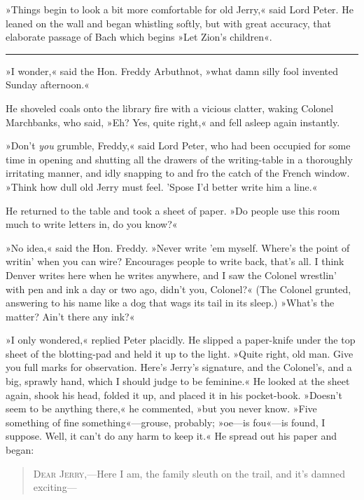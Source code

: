 »Things begin to look a bit more comfortable for old Jerry,« said Lord Peter. He leaned on the wall and began whistling softly, but with great accuracy, that elaborate passage of Bach which begins »Let Zion's children«.

\noindent\hfil\rule{0.5\textwidth}{.4pt}\hfil

»I wonder,« said the Hon. Freddy Arbuthnot, »what damn silly fool invented Sunday afternoon.«

He shoveled coals onto the library fire with a vicious clatter, waking Colonel Marchbanks, who said, »Eh? Yes, quite right,« and fell asleep again instantly.

»Don't \textit{you} grumble, Freddy,« said Lord Peter, who had been occupied for some time in opening and shutting all the drawers of the writing-table in a thoroughly irritating manner, and idly snapping to and fro the catch of the French window. »Think how dull old Jerry must feel. 'Spose I'd better write him a line.«

He returned to the table and took a sheet of paper. »Do people use this room much to write letters in, do you know?«

»No idea,« said the Hon. Freddy. »Never write 'em myself. Where's the point of writin' when you can wire? Encourages people to write back, that's all. I think Denver writes here when he writes anywhere, and I saw the Colonel wrestlin' with pen and ink a day or two ago, didn't you, Colonel?« (The Colonel grunted, answering to his name like a dog that wags its tail in its sleep.) »What's the matter? Ain't there any ink?«

»I only wondered,« replied Peter placidly. He slipped a paper-knife under the top sheet of the blotting-pad and held it up to the light.  »Quite right, old man. Give you full marks for observation. Here's Jerry's signature, and the Colonel's, and a big, sprawly hand, which I should judge to be feminine.« He looked at the sheet again, shook his head, folded it up, and placed it in his pocket-book. »Doesn't seem to be anything there,« he commented, »but you never know. »Five something of fine something«---grouse, probably; »oe\allowbreak---\allowbreak is fou«---is found, I suppose. Well, it can't do any harm to keep it.« He spread out his paper and began:

\begin{quote}
\textsc{Dear Jerry},---Here I am, the family sleuth on the trail, and it's damned exciting---
\end{quote}

